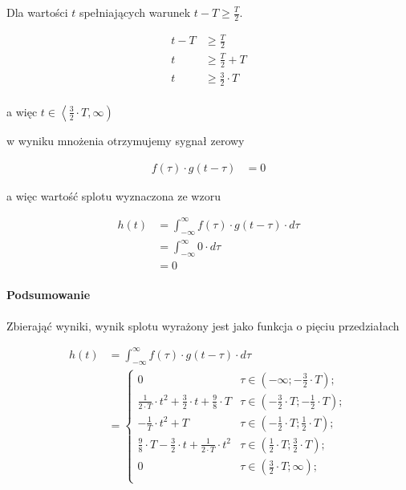 \begin{task}
Dla wartości $t$ spełniających warunek $t-T \geq \frac{T}{2}$.

\begin{align*}
t-T& \geq \frac{T}{2}\\
t& \geq \frac{T}{2}+T\\
t& \geq \frac{3}{2}\cdot T\\
\end{align*}

a więc $t\in \left<\frac{3}{2}\cdot T, \infty \right)$

w wyniku mnożenia otrzymujemy sygnał zerowy

\begin{align*}
f(\tau) \cdot g(t-\tau)&=0
\end{align*}

a więc wartość splotu wyznaczona ze wzoru

\begin{align*}
h(t)&=\int_{-\infty}^{\infty} f(\tau) \cdot g(t-\tau) \cdot d\tau\\
&=\int_{-\infty}^{\infty} 0 \cdot d\tau \\
&=0
\end{align*}

\paragraph{Podsumowanie}

Zbierająć wyniki, wynik splotu wyrażony jest jako funkcja o pięciu przedziałach

\begin{align*}
h(t)&=\int_{-\infty}^{\infty} f(\tau) \cdot g(t-\tau) \cdot d\tau\\
&=\begin{cases}
0 & \tau \in \left(-\infty; -\frac{3}{2}\cdot T\right);\\
\frac{1}{2\cdot T} \cdot t^2 + \frac{3}{2} \cdot t+\frac{9}{8} \cdot  T & \tau \in \left( -\frac{3}{2}\cdot T; -\frac{1}{2} \cdot T\right);\\
- \frac{1}{T}\cdot t^2 + T & \tau \in \left( -\frac{1}{2}\cdot T; \frac{1}{2} \cdot T\right);\\
\frac{9}{8}\cdot T - \frac{3}{2} \cdot t  +  \frac{1}{2 \cdot T} \cdot t^2 & \tau \in \left( \frac{1}{2}\cdot T; \frac{3}{2} \cdot T\right);\\
0 & \tau \in \left(\frac{3}{2}\cdot T ; \infty\right);\\
\end{cases}
\end{align*}


\end{task}
